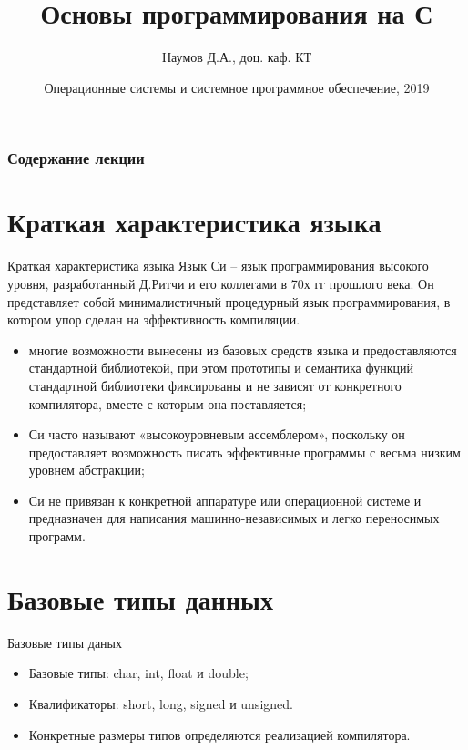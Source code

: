 \documentclass{beamer}
\title[Язык C]{Основы программирования на С}
\author{Наумов Д.А., доц. каф. КТ}
\date[11.02.2019] {Операционные системы и системное программное обеспечение, 2019}
\begin{document}
\begin{frame}
  \titlepage
\end{frame}
  
\begin{frame}
  \frametitle{Содержание лекции}
  \tableofcontents  
\end{frame}

\section{Краткая характеристика языка}

\begin{frame}{Краткая характеристика языка}
Язык Си – язык программирования высокого уровня, разработанный Д.Ритчи и его коллегами в 70х гг прошлого века. Он представляет собой минималистичный процедурный язык программирования, в котором упор сделан на эффективность компиляции.
\begin{itemize}
\item многие возможности вынесены из базовых средств языка и предоставляются стандартной библиотекой, при этом прототипы и семантика функций стандартной библиотеки фиксированы и не зависят от конкретного компилятора, вместе с которым она поставляется;
\item Си часто называют «высокоуровневым ассемблером», поскольку он предоставляет возможность писать эффективные программы с весьма низким уровнем абстракции;
\item Си не привязан к конкретной аппаратуре или операционной системе и предназначен для написания машинно-независимых и легко переносимых программ.
\end{itemize}
\end{frame} 

\section{Базовые типы данных}
\begin{frame}{Базовые типы даных}
\begin{itemize}
\item Базовые типы: char, int, float и double;
\item Квалификаторы: short, long, signed и unsigned.
\item Конкретные размеры типов определяются реализацией компилятора.
\end{itemize}
\end{frame} 
\end{document}
